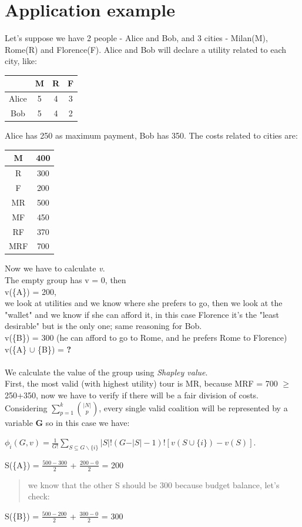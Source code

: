 \documentclass{article}
\begin{document}
\section{Application example}
\Large{
Let's suppose we have 2 people - Alice and Bob, and 3 cities - Milan(M), Rome(R) and Florence(F). Alice and Bob will declare a utility related to each city, like:
\begin{center}
\begin{tabular}{ |c|c|c|c| } 
 \hline
  & M & R & F \\ 
 \hline
 Alice & 5 & 4 & 3\\ 
 \hline
 Bob & 5 & 4 & 2\\ 
 \hline
\end{tabular}
\end{center}
Alice has 250 as maximum payment, Bob has 350. The costs related to cities are:
\begin{center}
\begin{tabular}{ |c|c| } 
 \hline
 M & 400 \\ 
 \hline
 R & 300\\ 
 \hline
 F & 200\\ 
 \hline
 MR & 500\\ 
 \hline
 MF & 450\\ 
 \hline
 RF & 370\\ 
 \hline
 MRF & 700\\ 
 \hline
\end{tabular}
\end{center}
Now we have to calculate \textit{v}. \\The empty group has v = 0, then \\v(\{A\}) = 200, \\we look at utilities and we know where she prefers to go, then we look at the "wallet" and we know if she can afford it, in this case Florence it's the "least desirable" but is the only one; same reasoning for Bob.\\
v(\{B\}) = 300 (he can afford to go to Rome, and he prefers Rome to Florence)\\
v(\{A\} $\cup$ \{B\}) = \textbf{?} \\\\
We calculate the value of the group using \textit{Shapley value}.\\
First, the most valid (with highest utility) tour is MR, because MRF = 700 $\ge$ 250+350, now we have to verify if there will be a fair division of costs.\\
Considering $\displaystyle\sum_{p=1}^k \binom {\vert N \vert} {p}$, every single valid coalition will be represented by a variable \textbf{G} so in this case we have:
\begin{center}
   \normalsize{
        $\phi_i(G,v) = \frac{1}{G!} \displaystyle \sum_{S \subseteq G \backslash \{i\}} \vert S \vert!(G -  \vert S \vert - 1)! [v(S \cup \{i\}) - v(S)]$.
    }
\end{center}
S(\{A\}) = $\frac {500 - 300} {2}$ + $\frac {200 - 0} {2}$  = 200
\begin{quote}
    we know that the other S should be 300 because budget balance, let's check:
\end{quote}
S(\{B\}) = $\frac {500 - 200} {2}$ + $\frac {300 - 0} {2}$ = 300
}
\end{document}
